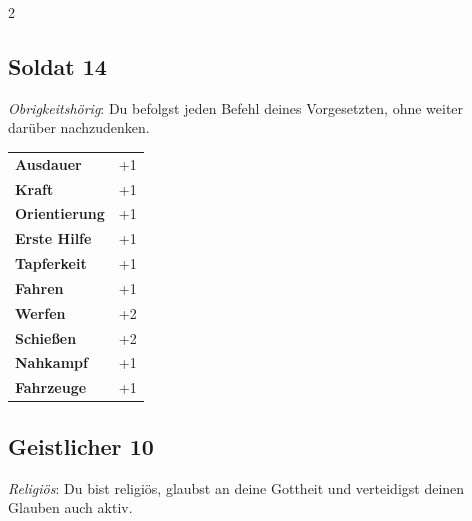 \begin{multicols}{2}
\begin{tcolorbox}

\end{tcolorbox}

\begin{tcolorbox}
    \subsection*{Soldat \hfill \small{14 }}
    \tcblower
\textit{Obrigkeitshörig}: Du befolgst jeden Befehl deines Vorgesetzten, ohne weiter darüber nachzudenken.


\vspace{3mm}

\begin{tabular}{@{}ll@{}}
    \textbf{Ausdauer} & +1\\
    \textbf{Kraft} & +1\\
    \textbf{Orientierung} & +1\\
    \textbf{Erste Hilfe} & +1\\
    \textbf{Tapferkeit} & +1\\
    \textbf{Fahren} & +1\\
    \textbf{Werfen} & +2\\
    \textbf{Schießen} & +2\\
    \textbf{Nahkampf} & +1\\
    \textbf{Fahrzeuge} & +1\\
\end{tabular}


\end{tcolorbox}

\begin{tcolorbox}
    \subsection*{Geistlicher \hfill \small{10 }}
    \tcblower
\textit{Religiös}: Du bist religiös, glaubst an deine Gottheit und verteidigst deinen Glauben auch aktiv.



\end{tcolorbox}
\end{multicols}
